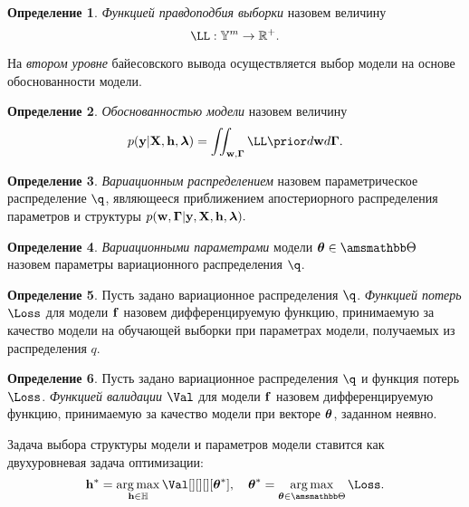 \documentclass[11pt, a5paper]{dissert}
\theoremstyle{definition}
\newtheorem{defin}{Определение}
\DeclareMathOperator*{\argmax}{arg\,max}
\begin{document}
\begin{defin}
\textit{Функцией правдоподбия выборки } назовем величину
\[
    \LL : {\yb}^m \to \mathbb{R}^{+}.
\]
\end{defin}
 
На \textit{втором уровне} байесовского вывода осуществляется выбор модели на основе обоснованности модели.
\begin{defin}
\textit{Обоснованностью модели }назовем величину
\begin{equation}
\label{eq:evidence}
\EV = \iint_{\mathbf{w}, \boldsymbol{\Gamma}} \LL \prior  d\mathbf{w}d\boldsymbol{\Gamma}.
\end{equation}
\end{defin}


\begin{defin}
\textit{Вариационным распределением} назовем параметрическое распределение $\q$, являющееся приближением  апостериорного распределения параметров и структуры $p(\mathbf{w}, \boldsymbol{\Gamma}|\mathbf{y}, \mathbf{X}, \mathbf{h},\boldsymbol{\lambda}).$ 
\end{defin}

\begin{defin}
\textit{Вариационными параметрами} модели $\teta \in \Tetab$ назовем параметры вариационного распределения $\q$.
\end{defin} 

\begin{defin}
\label{def:l}
Пусть задано вариационное распределения $\q$.
\textit{Функцией потерь} $\Loss$ для модели $\mathbf{f}$ назовем дифференцируемую функцию, принимаемую за качество модели на обучающей выборки при параметрах модели, получаемых из  распределения $q$.
\end{defin}

\begin{defin}
\label{def:q}
Пусть задано вариационное распределения $\q$ и функция потерь $\Loss$. 
\textit{Функцией валидации} $\Val$ для модели $\mathbf{f}$ назовем дифференцируемую функцию, принимаемую за качество модели при векторе $\boldsymbol{\theta}$, заданном неявно.
\end{defin}

 

Задача выбора структуры модели и параметров модели ставится как двухуровневая задача оптимизации:
\begin{equation}
\label{eq:optim_problem}
	\h^{*} = \argmax_{\h  \in \Hb} \Val[][][][\teta^{*}], \quad   \teta^{*} = \argmax_{\teta \in \Tetab} \Loss.
\end{equation}
\end{document}
